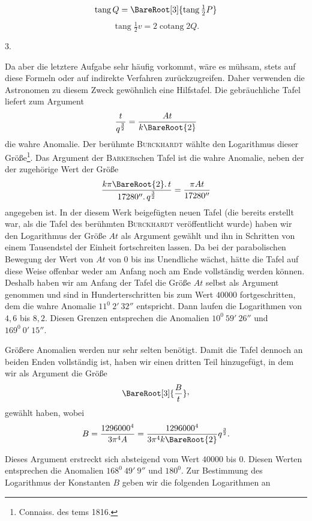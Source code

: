 \[
\operatorname{tang}Q=\BareRoot[3]{\operatorname{tang}\tfrac12P}
\]
\[
\operatorname{tang}\tfrac12v=2\operatorname{cotang}2Q.
\]
\par\medskip
{}
\begin{center}3.\end{center}
\noindent\hspace*{\parindent}Da aber die letztere Aufgabe sehr häufig vorkommt, wäre es mühsam, stets auf diese Formeln oder auf indirekte Verfahren zurückzugreifen. Daher verwenden die Astronomen zu diesem Zweck gewöhnlich eine Hilfstafel. Die gebräuchliche Tafel liefert zum Argument
\[
\frac{t}{q^{\frac32}}=\frac{At}{k\BareRoot{2}}
\]
die wahre Anomalie. Der berühmte \textsc{Burckhardt} wählte den Logarithmus dieser Größe\footnote{Connaiss. des tems 1816.}. Das Argument der \textsc{Barker}schen Tafel ist die wahre Anomalie, neben der der zugehörige Wert der Größe
\[
\frac{k\pi\BareRoot{2}\mathpunct{.}t}{17280''\mathpunct{.}q^{\frac32}}=\frac{\pi At}{17280''}
\]
angegeben ist. In der diesem Werk beigefügten neuen Tafel (die bereits erstellt war, als die Tafel des berühmten \textsc{Burckhardt} veröffentlicht wurde) haben wir den Logarithmus der Größe \(At\) als Argument gewählt und ihn in Schritten von einem Tausendstel der Einheit fortschreiten lassen. Da bei der parabolischen Bewegung der Wert von \(At\) von \(0\) bis ins Unendliche wächst, hätte die Tafel auf diese Weise offenbar weder am Anfang noch am Ende vollständig werden können. Deshalb haben wir am Anfang der Tafel die Größe \(At\) selbst als Argument genommen und sind in Hunderterschritten bis zum Wert \(40000\) fortgeschritten, dem die wahre Anomalie \(11^0\ 2'\ 32''\) entspricht. Dann laufen die Logarithmen von \(4{,}6\) bis \(8{,}2\). Diesen Grenzen entsprechen die Anomalien \(10^0\ 59'\ 26''\) und \(169^0\ 0'\ 15''\).
\par
{}
Größere Anomalien werden nur sehr selten benötigt. Damit die Tafel dennoch an beiden Enden vollständig ist, haben wir einen dritten Teil hinzugefügt, in dem wir als Argument die Größe
\[
\BareRoot[3]{\frac{B}{t}}\mathpunct{\raisebox{.45ex}{,}}
\]
gewählt haben, wobei
\[
B=\frac{1296000^4}{3\pi^4A}=\frac{1296000^4}{3\pi^4k\BareRoot{2}}q^{\frac32}.
\]
\par
{}
Dieses Argument erstreckt sich absteigend vom Wert \(40000\) bis \(0\). Diesen Werten entsprechen die Anomalien \(168^0\ 49'\ 9''\) und \(180^0\). Zur Bestimmung des Logarithmus der Konstanten \(B\) geben wir die folgenden Logarithmen an
